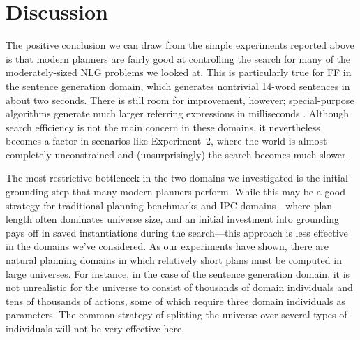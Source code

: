 \section{Discussion} \label{sec:discussion}

The positive conclusion we can draw from the simple experiments
reported above is that modern planners are fairly good at controlling
the search for many of the moderately-sized NLG problems we looked
at. This is particularly true for FF in the sentence generation
domain, which generates nontrivial 14-word sentences in about two
seconds. There is still room for improvement, however; special-purpose
algorithms generate much larger referring expressions in milliseconds
\cite{AreKolStr08}.  Although search efficiency is not the main
concern in these domains, it nevertheless becomes a factor in
scenarios like Experiment~2, where the world is almost completely
unconstrained and (unsurprisingly) the search becomes much slower.


The most restrictive bottleneck in the two domains we investigated is the
initial grounding step that many modern planners perform. While this may be
a good strategy for traditional planning benchmarks and IPC domains---where
plan length often dominates universe size, and an initial investment into
grounding pays off in saved instantiations during the search---this
approach is less effective in the domains we've considered. As our
experiments have shown, there are natural planning domains in which
relatively short plans must be computed in large universes. For instance,
in the case of the sentence generation domain, it is not unrealistic for
the universe to consist of thousands of domain individuals and tens of
thousands of actions, some of which require three domain individuals as
parameters. The common strategy of splitting the universe over several
types of individuals will not be very effective here.

